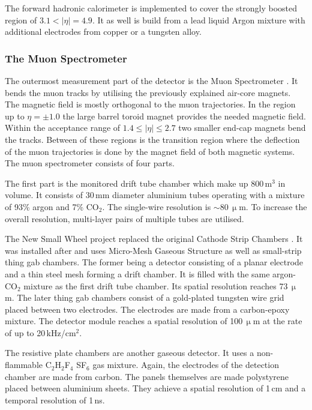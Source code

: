 \documentclass[bachelor,ngerman,english]{GAUBM}
\begin{document}
The forward hadronic calorimeter \cite{atlas:tech_design_report_01} is implemented to cover the strongly boosted region of $3.1<|\eta|=4.9$. It as well is build from a lead liquid Argon mixture with additional electrodes from copper or a tungsten alloy.

\subsubsection*{The Muon Spectrometer}
The outermost measurement part of the \atlas detector is the Muon Spectrometer \cite{atlas:tech_design_report_01,atlas:muon_chamber}. It bends the muon tracks by utilising the previously explained air-core magnets. The magnetic field is mostly orthogonal to the muon trajectories. In the region up to $\eta=\pm1.0$ the large barrel toroid magnet provides the needed magnetic field. Within the acceptance range of $1.4\leq|\eta|\leq2.7$ two smaller end-cap magnets bend the tracks. Between of these regions is the transition region where the deflection of the muon trajectories is done by the magnet field of both magnetic systems. The muon spectrometer consists of four parts.

The first part is the monitored drift tube chamber which make up 800\,m$^3$ in volume. It consists of 30\,mm diameter aluminium tubes operating with a mixture of 93\% argon and 7\% CO$_2$. The single-wire resolution is $\sim$80\,$\upmu$m. To increase the overall resolution, multi-layer pairs of multiple tubes are utilised.

The New Small Wheel project replaced the original Cathode Strip Chambers \cite{atlas:muon_chamber,atlas:muon_chamber_upgrade,atlas:new_small_wheel}. It was installed after \runii and uses Micro-Mesh Gaseous Structure as well as small-strip thing gab chambers. The former being a detector consisting of a planar electrode and a thin steel mesh forming a drift chamber. It is filled with the same argon-CO$_2$ mixture as the first drift tube chamber. Its spatial resolution reaches 73\,$\upmu$m. The later thing gab chambers consist of a gold-plated tungsten wire grid placed between two electrodes. The electrodes are made from a carbon-epoxy mixture. The detector module reaches a spatial resolution of 100\,$\upmu$m at the rate of up to 20\,kHz/cm$^2$.

The resistive plate chambers \cite{atlas:tech_design_report_01,atlas:muon_chamber,atlas:muon_chamber_upgrade} are another gaseous detector. It uses a non-flammable C$_2$H$_2$F$_4$ SF$_6$ gas mixture. Again, the electrodes of the detection chamber are made from carbon. The panels themselves are made polystyrene placed between aluminium sheets. They achieve a spatial resolution of 1\,cm and a temporal resolution of 1\,ns.
\end{document}
